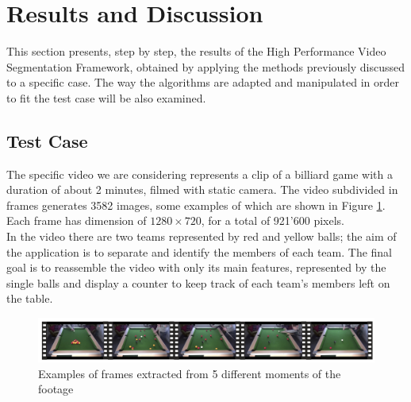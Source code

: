 \documentclass{usiinftr}
\begin{document}
\section{Results and Discussion}
This section presents, step by step, the results of the High Performance Video Segmentation Framework, obtained by applying the methods previously discussed to a specific case. The way the algorithms are adapted and manipulated in order to fit the test case will be also examined. 

\subsection{Test Case}
The specific video we are considering represents a clip of a billiard game with a duration of about 2 minutes, filmed with static camera. The video subdivided in frames generates 3582 images, some examples of which are shown in Figure \ref{fig:4}. Each frame has dimension of $1280 \times 720$,  for a total of 921'600 pixels. \\
In the video there are two teams represented by red and yellow balls; the aim of the application is to separate and identify the members of each team. The final goal is to reassemble the video with only its main features, represented by the single balls and display a counter to keep track of each team's members left on the table. 

\begin{figure}[h]
	\centering
	\includegraphics[width=0.98\linewidth]{img/video_frames}
	\caption{Examples of frames extracted from 5 different moments of the footage}
	\label{fig:4}
\end{figure}
\end{document}
